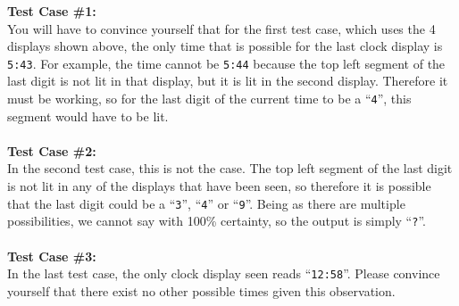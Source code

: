 \documentclass[a4paper,11pt,oneside]{article}
\begin{document}
\textbf{Test Case \#1:}\\
You will have to convince yourself that for the first test case, which uses the 4 displays
shown above, the only time that is possible for the last clock display is
\texttt{5:43}. For example, the time cannot be \texttt{5:44} because the top left segment of the
last digit is not lit in that display, but it is lit in the second display.
Therefore it must be working, so for the last digit of the current time to be a ``\texttt{4}'',
this segment would have to be lit.
\\\\
\textbf{Test Case \#2:}\\
In the second test case, this is not the case. The top left segment of the last digit is not lit
in any of the displays that have been seen, so therefore it is possible that the last digit could
be a ``\texttt{3}'', ``\texttt{4}'' or ``\texttt{9}''. Being as there are multiple possibilities,
we cannot say with 100\% certainty, so the output is simply ``\texttt{?}''.
\\\\
\textbf{Test Case \#3:}\\
In the last test case, the only clock display seen reads ``\texttt{12:58}''. Please convince yourself
that there exist no other possible times given this observation.
\end{document}
